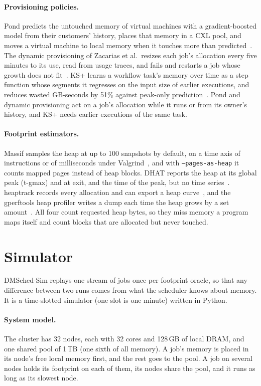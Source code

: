\documentclass[11pt]{article}
\begin{document}
\paragraph{Provisioning policies.} Pond predicts the untouched memory of virtual machines with a gradient-boosted model
from their customers' history, places that memory in a CXL pool, and moves a virtual machine to local memory when it
touches more than predicted~\cite{Li2023Pond}. The dynamic provisioning of Zacarias et al.\ resizes each job's allocation
every five minutes to its use, read from usage traces, and fails and restarts a job whose growth does not
fit~\cite{Zacarias2023Dynamic}. KS+ learns a workflow task's memory over time as a step function whose segments it
regresses on the input size of earlier executions, and reduces wasted GB-seconds by 51\% against peak-only
prediction~\cite{KSplus2024}. Pond and dynamic provisioning act on a job's allocation while it runs or from its owner's
history, and KS+ needs earlier executions of the same task.

\paragraph{Footprint estimators.} Massif samples the heap at up to 100 snapshots by default, on a time axis of
instructions or of milliseconds under Valgrind~\cite{ValgrindMassif}, and with \texttt{--pages-as-heap} it counts mapped
pages instead of heap blocks. DHAT reports the heap at its global peak (t-gmax) and at exit, and the time of the peak,
but no time series~\cite{ValgrindDHAT}. heaptrack records every allocation and can export a heap curve~\cite{heaptrack},
and the gperftools heap profiler writes a dump each time the heap grows by a set amount~\cite{gperftools}. All four count
requested heap bytes, so they miss memory a program maps itself and count blocks that are allocated but never touched.

\section{Simulator}
\label{sec:sim}

DMSched-Sim replays one stream of jobs once per footprint oracle, so that any difference between two runs comes from
what the scheduler knows about memory. It is a time-slotted simulator (one slot is one minute) written in Python.

\paragraph{System model.} The cluster has 32 nodes, each with 32 cores and 128\,GB of local DRAM, and one shared pool of
1\,TB (one sixth of all memory). A job's memory is placed in its node's free local memory first, and the rest goes to the
pool. A job on several nodes holds its footprint on each of them, its nodes share the pool, and it runs as long as its
slowest node.
\end{document}

